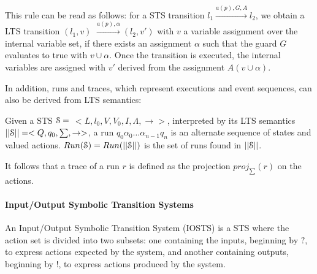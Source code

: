 This rule can be read as follows: for a STS transition $l_1
\xrightarrow{a(p),G,A}l_2$, we obtain a LTS transition $(l_1,v)$
$\xrightarrow{a(p),\alpha} (l_2,v')$ with $v$ a variable
assignment over the internal variable set, if there exists an
assignment $\alpha$ such that the guard $G$ evaluates to true
with $v \cup \alpha$. Once the transition is executed, the
internal variables are assigned with $v'$ derived from the
assignment $A(v \cup \alpha)$.

In addition, runs and traces, which represent executions and
event sequences, can also be derived from LTS semantics:

\begin{definition}
    Given a STS $\EuScript{S}=$ $<L,l_0,V,V_0,I,\Lambda,
	\rightarrow>$, interpreted by its LTS semantics
	$||\EuScript{S}||=<Q,q_0,\sum,\rightarrow>$, a run $q_0
	\alpha_0 \dots \alpha_{n-1} q_n$ is an alternate sequence of states
    and valued actions. $Run(\EuScript{S})=Run(||\EuScript{S}||)$ is
	the set of runs found in $||\EuScript{S}||$.

    It follows that a trace of a run $r$ is defined as the projection
    $proj_{\sum}(r)$ on the actions.

	\label{def:runs-and-traces}
\end{definition}

\paragraph{Input/Output Symbolic Transition Systems}
\label{sec:definitions:iosts}

An Input/Output Symbolic Transition System (IOSTS) is a STS where
the action set is divided into two subsets: one containing the
inputs, beginning by $?$, to express actions expected by the
system, and another containing outputs, beginning by $!$, to
express actions produced by the system.


